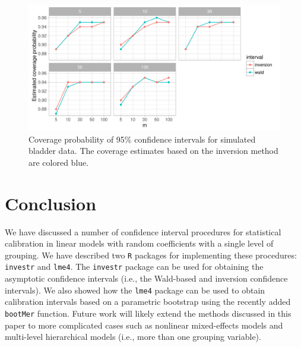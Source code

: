 \documentclass{article}\usepackage[]{graphicx}\usepackage[]{color}
\makeatletter
\def\maxwidth{ %
  \ifdim\Gin@nat@width>\linewidth
    \linewidth
  \else
    \Gin@nat@width
  \fi
}
\newenvironment{knitrout}{}{} %
\makeatother
\begin{document}
\begin{knitrout}
\color{fgcolor}\begin{figure}[!htb]
\includegraphics[width=\maxwidth]{figure/simulation-1} \caption[Coverage probability of 95\% confidence intervals for simulated bladder data]{Coverage probability of 95\% confidence intervals for simulated bladder data. The coverage estimates based on the inversion method are colored blue.}\label{fig:simulation}
\end{figure}


\end{knitrout}


\section{Conclusion}

We have discussed a number of confidence interval procedures for statistical calibration in linear models with random coefficients with a single level of grouping.  We have described two \texttt{R} packages for implementing these procedures: \texttt{investr} and \texttt{lme4}.  The \texttt{investr} package can be used for obtaining the asymptotic confidence intervals (i.e., the Wald-based and inversion confidence intervals).  We also showed how the \texttt{lme4} package can be used to obtain calibration intervals based on a parametric bootstrap using the recently added \texttt{bootMer} function.  Future work will likely extend the methods discussed in this paper to more complicated cases such as nonlinear mixed-effects models and multi-level hierarchical models (i.e., more than one grouping variable).



\end{document}

